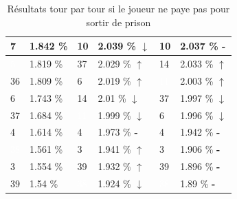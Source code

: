 \documentclass[letterpaper]{article}
\newcommand{\caseUp}[1][]{#1\textcolor[HTML]{008000}{$\mathbf{\uparrow}$}}
\newcommand{\caseStable}[1][]{#1\textcolor[HTML]{3779dd}{\textbf{-}}}
\newcommand{\caseDown}[1][]{#1\textcolor[HTML]{dd3737}{$\mathbf{\downarrow}$}}
\begin{document}
\begin{table}
\begin{tabular}{|l|l||l|l||l|l|}
	  \cellcolor[HTML]{1E90FF} 7 & 1.842 \% & \cellcolor[HTML]{1E90FF} 10 & 2.039 \% \caseDown[\hfill] & \cellcolor[HTML]{1E90FF} 10 & 2.037 \% \caseStable[\hfill] \\ \hline
	  \cellcolor[HTML]{8B1A1A} \textcolor{white}{5} & 1.819 \% & \cellcolor[HTML]{FFC1C1} 37 & 2.029 \% \caseUp[\hfill] & \cellcolor[HTML]{FF69B4} 14 & 2.033 \% \caseUp[\hfill] \\ \hline
	  \cellcolor[HTML]{E6E6FA} 36 & 1.809 \% & \cellcolor[HTML]{E6E6FA} 6 & 2.019 \% \caseUp[\hfill] & \cellcolor[HTML]{000000} \textcolor{white}{11} & 2.003 \% \caseUp[\hfill] \\ \hline
	  \cellcolor[HTML]{E6E6FA} 6 & 1.743 \% & \cellcolor[HTML]{FF69B4} 14 & 2.01 \% \caseDown[\hfill] & \cellcolor[HTML]{FFC1C1} 37 & 1.997 \% \caseDown[\hfill] \\ \hline
	  \cellcolor[HTML]{FFC1C1} 37 & 1.684 \% & \cellcolor[HTML]{000000} \textcolor{white}{11} & 1.999 \% \caseDown[\hfill] & \cellcolor[HTML]{E6E6FA} 6 & 1.996 \% \caseDown[\hfill] \\ \hline
	  \cellcolor[HTML]{A0522D} 4 & 1.614 \% & \cellcolor[HTML]{A0522D} 4 & 1.973 \% \caseStable[\hfill] & \cellcolor[HTML]{A0522D} 4 & 1.942 \% \caseStable[\hfill] \\ \hline
	  \cellcolor[HTML]{483D8B} \textcolor{white}{38} & 1.561 \% & \cellcolor[HTML]{EEEED1} 3 & 1.941 \% \caseUp[\hfill] & \cellcolor[HTML]{EEEED1} 3 & 1.906 \% \caseStable[\hfill] \\ \hline
	  \cellcolor[HTML]{EEEED1} 3 & 1.554 \% & \cellcolor[HTML]{8B1A1A} 39 & 1.932 \% \caseUp[\hfill] & \cellcolor[HTML]{8B1A1A} 39 & 1.896 \% \caseStable[\hfill] \\ \hline
	  \cellcolor[HTML]{8B1A1A} 39 & 1.54 \% & \cellcolor[HTML]{483D8B} \textcolor{white}{38} & 1.924 \% \caseDown[\hfill] & \cellcolor[HTML]{483D8B} \textcolor{white}{38} & 1.89 \% \caseStable[\hfill] \\ \hline
	\end{tabular}
	\caption{Résultats tour par tour si le joueur ne paye pas pour 
	sortir de prison}
	\label{result_tour_paye_pas}
      \end{table}
      
\end{document}
